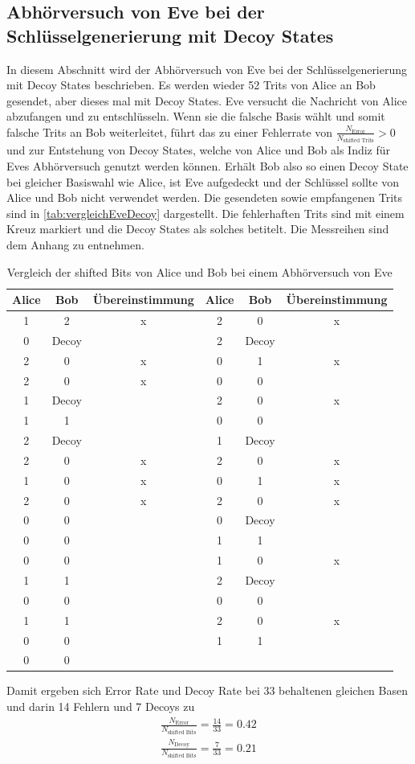 \subsection{Abhörversuch von Eve bei der Schlüsselgenerierung mit Decoy States}
\label{sec:a4}
In diesem Abschnitt wird der Abhörversuch von Eve bei der Schlüsselgenerierung mit
Decoy States beschrieben. Es werden wieder 52 Trits von Alice an Bob gesendet, aber
dieses mal mit Decoy States. Eve versucht die Nachricht von Alice abzufangen und zu
entschlüsseln. Wenn sie die falsche Basis wählt und somit falsche Trits an Bob 
weiterleitet, führt das zu einer Fehlerrate von $\frac{N_\text{Error}}{N_\text{shifted Trits}} > 0$
und zur Entstehung von Decoy States, welche von Alice und Bob als Indiz für Eves
Abhörversuch genutzt werden können. Erhält Bob also so einen Decoy State bei gleicher
Basiswahl wie Alice, ist Eve aufgedeckt und der Schlüssel sollte von Alice und Bob
nicht verwendet werden. Die gesendeten sowie empfangenen Trits sind in \autoref{tab:vergleichEveDecoy}
dargestellt. Die fehlerhaften Trits sind mit einem Kreuz markiert und die Decoy
States als solches betitelt. Die Messreihen sind dem Anhang zu entnehmen.

\begin{table}[H]
\centering
\begin{tabular}{c|c|c|c|c|c}
\textbf{Alice} &  \textbf{Bob} & Übereinstimmung &\textbf{Alice} &  \textbf{Bob} & Übereinstimmung \\ \hline
1 & 2     &  x   & 2 & 0     &  x  \\
0 & Decoy &     & 2 & Decoy &    \\    
2 & 0     &  x   & 0 & 1     &  x  \\
2 & 0     &  x   & 0 & 0     &    \\
1 & Decoy &     & 2 & 0     &  x  \\
1 & 1     &     & 0 & 0     &    \\
2 & Decoy &     & 1 & Decoy &    \\    
2 & 0     &  x   & 2 & 0     &  x  \\
1 & 0     &  x   & 0 & 1     &  x  \\
2 & 0     &  x   & 2 & 0     &  x  \\
0 & 0     &     & 0 & Decoy &    \\    
0 & 0     &     & 1 & 1     &    \\
0 & 0     &     & 1 & 0     &    x\\
1 & 1     &     & 2 & Decoy &    \\    
0 & 0     &     & 0 & 0     &    \\
1 & 1     &     & 2 & 0     &   x \\
0 & 0     &     & 1 & 1     &    \\
0 & 0     &     &   &       &    \\
\hline
\end{tabular}
\caption{Vergleich der shifted Bits von Alice und Bob bei einem Abhörversuch von Eve}
\label{tab:vergleichEveDecoy}
\end{table}

\noindent Damit ergeben sich Error Rate und Decoy Rate bei 33 behaltenen gleichen Basen
und darin 14 Fehlern und 7 Decoys zu 
\begin{align}
  \frac{N_\text{Error}}{N_\text{shifted Bits}} = \frac{14}{33} = 0.42 \\
  \frac{N_\text{Decoy}}{N_\text{shifted Bits}} = \frac{7}{33} = 0.21
\end{align}